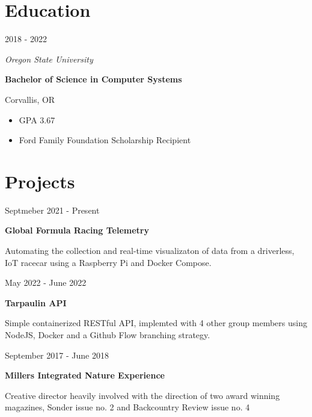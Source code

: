 \documentclass[12pt,letterpaper]{article}
\begin{document}
	
	\noindent
	\begin{minipage}[t]{0.45\linewidth}

		\vspace{0.5cm}

	\section*{Education}
	2018 - 2022
	
	\textit{Oregon State University}


	\textbf{Bachelor of Science in Computer Systems}

	Corvallis, OR
    
    \begin{itemize}
        \item GPA 3.67 
        \item Ford Family Foundation Scholarship Recipient
        
    \end{itemize}
    
    \section*{Projects}
    
    Septmeber 2021 - Present

    \textbf{Global Formula Racing Telemetry}

    Automating the collection and real-time visualizaton of data from a driverless, IoT racecar using a Raspberry Pi and Docker Compose. 
    
    \vspace{0.5cm}
   
    May 2022 - June 2022
   
    \textbf{Tarpaulin API}
  
    Simple containerized RESTful API, implemted with 4 other group members using NodeJS, Docker and a Github Flow branching strategy. 

    \vspace{0.5cm}
 
    September 2017 - June 2018
    
    \textbf{Millers Integrated Nature Experience}
    
    Creative director heavily involved with the direction of two award winning magazines, Sonder issue no. 2 and Backcountry Review issue no. 4
	
\end{minipage}
\hspace{1cm}
\end{document}
